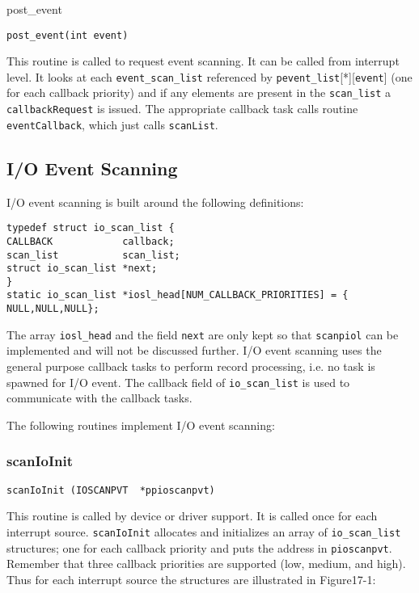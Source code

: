 \subsubsection{} post\_event

\begin{verbatim}post_event(int event)
\end{verbatim}This routine is called to request  event scanning. It can be called from interrupt level. It looks at each 
\verb|event_scan_list| referenced by \verb|pevent_list|[*][\verb|event|] (one for each callback priority) and if any elements are 
present in the \verb|scan_list| a \verb|callbackRequest| is issued. The appropriate callback task calls routine 
\verb|eventCallback|, which just calls \verb|scanList|. 

\subsection{I/O Event Scanning}

I/O event scanning is built around the following definitions:

\begin{verbatim}typedef struct io_scan_list {
CALLBACK            callback;
scan_list           scan_list;
struct io_scan_list *next;
}
static io_scan_list *iosl_head[NUM_CALLBACK_PRIORITIES] = {
NULL,NULL,NULL};
\end{verbatim}The array \verb|iosl_head| and the field \verb|next| are only kept so that \verb|scanpiol| can be implemented and will not be discussed 
further. I/O event scanning uses the general purpose callback tasks to perform record processing, i.e. no task is spawned 
for I/O event. The callback field of \verb|io_scan_list| is used to communicate with the callback tasks.

The following routines implement I/O event scanning:

\subsubsection{scanIoInit}

\begin{verbatim}scanIoInit (IOSCANPVT  *ppioscanpvt)
\end{verbatim}This routine is called by device or driver support. It is called once for each interrupt source. \verb|scanIoInit| allocates and 
initializes an array of \verb|io_scan_list| structures; one for each callback priority and puts the address in \verb|pioscanpvt|. 
Remember that three callback priorities are supported (low, medium, and high). Thus for each interrupt source the 
structures are illustrated in Figure17-1:

